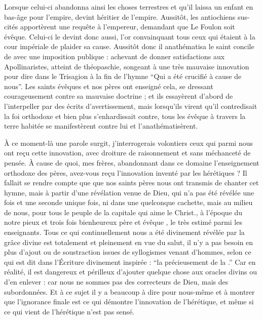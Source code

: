 Lorsque celui-ci abandonna ainsi les choses terrestres  et qu'il laissa un enfant en bas-âge pour l'empire,   devint héritier de l'empire. %
Aussitôt, les antiochiens sus-cités apportèrent une requête à l'empereur, demandant que Le Foulon soit évêque. 
Celui-ci le devint donc aussi, l'or convainquant tous ceux qui étaient à la cour impériale de plaider sa cause.
Aussitôt donc il anathématisa le saint concile de  avec une imposition publique : achevant de donner satisfactions aux Apollinaristes, atteint de théopaschie, songeant à une très mauvaise innovation pour dire dans le Trisagion à la fin de l'hymne \enquote{Qui a été crucifié à cause de nous}.
Les saints évêques et nos pères ont enseigné cela, se dressant courageusement contre sa mauvaise doctrine ; 
et ils essayèrent d'abord de l'interpeller par des écrits d'avertissement, mais lorsqu'ils virent qu'il contredisait la foi orthodoxe et bien plus s'enhardissait contre, tous les évêque à travers la terre habitée se manifestèrent contre lui et l'anathématisèrent.  


À ce moment-là une  parole surgit,  %
j'interrogerais volontiers ceux qui parmi nous ont reçu cette innovation, avec droiture de raisonnement et sans méchanceté de pensée.
À cause de quoi, mes frères, abandonnant dans ce domaine l'enseignement orthodoxe des pères, avez-vous reçu   l'innovation inventé par les hérétiques ? 
Il fallait se rendre compte que  
que nos saints pères nous ont transmis de chanter cet hymne, 
mais à partir d'une révélation venue de Dieu,  
qui n'a pas été révélée une fois et une seconde unique fois,
ni dans une quelconque cachette, %
mais au milieu de nous, 
pour tous le peuple de  la capitale qui aime le Christ.,
à l'époque du notre pieux et trois fois bienheureux père et évêque ,
le très estimé parmi les enseignants.
Tous ce qui continuellement nous a   été divinement révélée  par la grâce divine est totalement et pleinement en vue du salut, 
il n'y a pas besoin en plus d'ajout ou de soustraction issues de syllogismes venant d'hommes,
selon ce qui est dit dans l'Écriture divinement inspirée :
\enquote{la  précieusement  de la .}
Car en réalité, il est dangereux et périlleux d'ajouter quelque chose aux oracles divins ou d'en enlever : car nous ne sommes pas des correcteurs de Dieu, mais des subordonnées. 
Et à ce sujet il y a beaucoup à  dire pour nous-même et à montrer que 
l'ignorance finale est ce qui démontre l'innovation de l'hérétique, et même si ce qui vient de l'hérétique n'est pas sensé.


